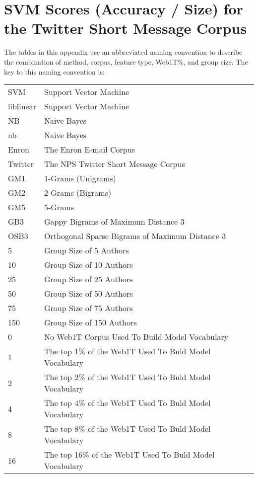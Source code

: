 \chapter{SVM Scores (Accuracy / Size) for the Twitter Short Message Corpus}

The tables in this appendix use an abbreviated naming convention to describe the combination of method, corpus, feature type, Web1T\%, and group size.  The key to this naming convention is:

\begin{center}
\begin{table}[htbp!]
	\begin{center}
	\begin{tabular}{ll}
	SVM & Support Vector Machine\\
	liblinear & Support Vector Machine\\
	NB & Naive Bayes\\
	nb & Naive Bayes\\
	
	Enron & The Enron E-mail Corpus\\
	Twitter & The NPS Twitter Short Message Corpus\\
	
	GM1 & 1-Grams (Unigrams)\\
	GM2 & 2-Grams (Bigrams)\\
	GM5 & 5-Grams\\
	GB3 & Gappy Bigrams of Maximum Distance 3\\
	OSB3 & Orthogonal Sparse Bigrams of Maximum Distance 3\\
		
	5 & Group Size of 5 Authors\\
	10 & Group Size of 10 Authors\\
	25 & Group Size of 25 Authors\\
	50 & Group Size of 50 Authors\\
	75 & Group Size of 75 Authors\\
	150 & Group Size of 150 Authors\\
	
	0 & No Web1T Corpus Used To Build Model Vocabulary\\
	1 & The top 1\% of the Web1T Used To Buld Model Vocabulary\\
	2 & The top 2\% of the Web1T Used To Buld Model Vocabulary\\
	4 & The top 4\% of the Web1T Used To Buld Model Vocabulary\\
	8 & The top 8\% of the Web1T Used To Buld Model Vocabulary\\
	16 & The top 16\% of the Web1T Used To Buld Model Vocabulary\\
	\end{tabular}
	\end{center}
\end{table}
\end{center}


